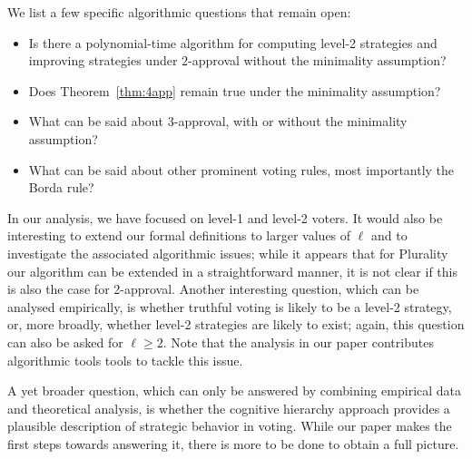\documentclass[11pt]{article}
\begin{document}
We list a few specific algorithmic questions that remain open:
\begin{itemize}
\item Is there a polynomial-time algorithm for computing level-2 strategies and improving strategies under $2$-approval 
without the minimality assumption?
\item Does Theorem~\ref{thm:4app} remain true under the minimality assumption?
\item What can be said about $3$-approval, with or without the minimality assumption?
\item What can be said about other prominent voting rules, most importantly the Borda rule?
\end{itemize}

In our analysis, we have focused on level-1 and level-2 voters. It would also be interesting
to extend our formal definitions to larger values of $\ell$ and 
to investigate the associated algorithmic issues;
while it appears that for Plurality our algorithm can be extended in a straightforward manner, 
it is not clear if this is also the case for 2-approval.
Another interesting question, which can be analysed empirically, is whether truthful voting is likely to be a level-2 strategy,
or, more broadly, whether level-2 strategies are likely to exist; again, this question
can also be asked for $\ell\ge 2$. Note that the analysis in our paper contributes algorithmic tools
tools to tackle this issue.

A yet broader question, which can only be answered by combining empirical data and theoretical analysis,  
is whether the cognitive hierarchy approach provides a plausible
description of strategic behavior in voting. While our paper makes the first steps towards answering it, 
there is more to be done to obtain a full picture.




\end{document}
